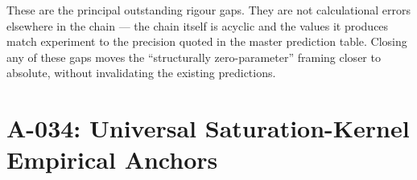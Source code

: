 These are the principal outstanding rigour gaps. They are not calculational errors elsewhere in the chain --- the chain itself is acyclic and the values it produces match experiment to the precision quoted in the master prediction table. Closing any of these gaps moves the ``structurally zero-parameter'' framing closer to absolute, without invalidating the existing predictions.

\section{A-034: Universal Saturation-Kernel Empirical Anchors}
\label{sec:a034_empirical_anchors}

